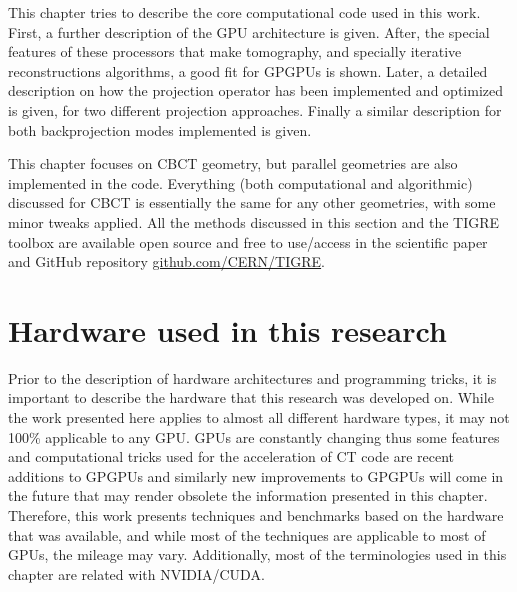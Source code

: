 
 This chapter tries to describe the core computational code used in this work. First, a further description of the GPU architecture is given. After, the special features of these processors that make tomography, and specially iterative reconstructions algorithms, a good fit for GPGPUs is shown. Later, a detailed description on how the projection operator has been implemented and optimized is given, for two different projection approaches.  Finally a similar description for both backprojection modes implemented is given.


This chapter focuses on CBCT geometry, but parallel geometries are also implemented in the code. Everything (both computational and algorithmic) discussed for CBCT is essentially the same for any other geometries, with some minor tweaks applied. All the methods discussed in this section and the TIGRE toolbox are available open source and free to use/access in the scientific paper\cite{TIGRE} and GitHub repository \href{https://github.com/CERN/TIGRE}{github.com/CERN/TIGRE}.

\section{Hardware used in this research}
Prior to the description of hardware architectures and programming tricks, it is important to describe the hardware that this research was developed on. While the work presented here applies to almost all different hardware types, it may not 100\% applicable to any GPU. GPUs are constantly changing thus some features and computational tricks used for the acceleration of CT code are recent additions to GPGPUs and similarly new improvements to GPGPUs will come in the future that may render obsolete the information presented in this chapter. Therefore, this work presents techniques and benchmarks based on the hardware that was available, and while most of the techniques are applicable to most of GPUs, the mileage may vary. Additionally, most of the terminologies used in this chapter are related with NVIDIA/CUDA.

